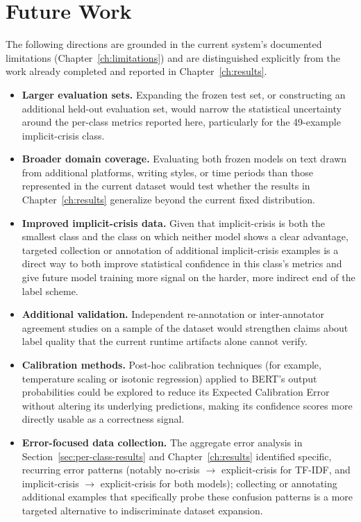 \chapter{Future Work}

The following directions are grounded in the current system's documented limitations (Chapter~\ref{ch:limitations}) and are distinguished explicitly from the work already completed and reported in Chapter~\ref{ch:results}.

\begin{itemize}[nosep,leftmargin=*]
  \item \textbf{Larger evaluation sets.} Expanding the frozen test set, or constructing an additional held-out evaluation set, would narrow the statistical uncertainty around the per-class metrics reported here, particularly for the 49-example implicit-crisis class.

  \item \textbf{Broader domain coverage.} Evaluating both frozen models on text drawn from additional platforms, writing styles, or time periods than those represented in the current dataset would test whether the results in Chapter~\ref{ch:results} generalize beyond the current fixed distribution.

  \item \textbf{Improved implicit-crisis data.} Given that implicit-crisis is both the smallest class and the class on which neither model shows a clear advantage, targeted collection or annotation of additional implicit-crisis examples is a direct way to both improve statistical confidence in this class's metrics and give future model training more signal on the harder, more indirect end of the label scheme.

  \item \textbf{Additional validation.} Independent re-annotation or inter-annotator agreement studies on a sample of the dataset would strengthen claims about label quality that the current runtime artifacts alone cannot verify.

  \item \textbf{Calibration methods.} Post-hoc calibration techniques (for example, temperature scaling or isotonic regression) applied to BERT's output probabilities could be explored to reduce its Expected Calibration Error without altering its underlying predictions, making its confidence scores more directly usable as a correctness signal.

  \item \textbf{Error-focused data collection.} The aggregate error analysis in Section~\ref{sec:per-class-results} and Chapter~\ref{ch:results} identified specific, recurring error patterns (notably no-crisis $\rightarrow$ explicit-crisis for TF-IDF, and implicit-crisis $\rightarrow$ explicit-crisis for both models); collecting or annotating additional examples that specifically probe these confusion patterns is a more targeted alternative to indiscriminate dataset expansion.


\end{itemize}
